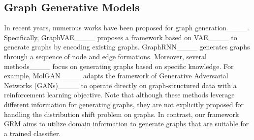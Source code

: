 







\subsection{Graph Generative Models}
In recent years, numerous works have been proposed for graph generation____. Specifically, GraphVAE____ proposes a framework based on VAE____ to generate graphs by encoding existing graphs. GraphRNN____ generates graphs through a sequence of node and edge formations. Moreover, several methods____ focus on generating graphs based on specific knowledge. For example, MolGAN____ adapts the framework of Generative Adversarial Networks
(GANs)____ to operate directly on graph-structured data with a reinforcement learning objective. Note that although these methods leverage different information for generating graphs, they are not explicitly proposed for handling the distribution shift problem on graphs. In contrast, our framework GRM aims to utilize domain information to generate graphs that are suitable for a trained classifier. 

